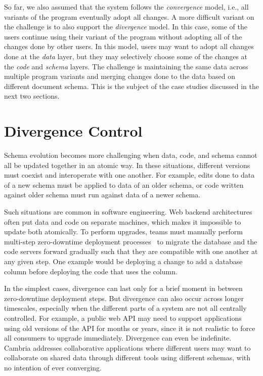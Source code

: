 \documentclass[english,crc]{programming}
\begin{document}
So far, we also assumed that the system follows the \emph{convergence} model, i.e., all variants
of the program eventually adopt all changes. A more difficult variant on the challenge is to also
support the \emph{divergence} model. In this case, some of the users continue using their variant
of the program without adopting all of the changes done by other users. In this model, users
may want to adopt all changes done at the \emph{data} layer, but they may selectively choose
some of the changes at the \emph{code} and \emph{schema} layers. The challenge is maintaining the
same data across multiple program variants and merging changes done to the data based on
different document schema. This is the subject of the case studies discussed in the next two
sections.


\section{Divergence Control}

Schema evolution becomes more challenging when data, code, and schema cannot all be updated
together in an atomic way. In these situations, different versions must coexist and interoperate
with one another. For example, edits done to data of a new schema must be applied to
data of an older schema, or code written against older schema must run against data of a newer schema.

Such situations are common in software engineering. Web backend architectures often put data and
code on separate machines, which makes it impossible to update both atomically. To perform
upgrades, teams must manually perform multi-step zero-downtime deployment processes~\cite{planetscalerails}
to migrate the database and the code servers forward gradually such that they are compatible with one
another at any given step. One example would be deploying a change to add a database column
before deploying the code that uses the column.

In the simplest cases, divergence can last only for a brief moment in between zero-downtime
deployment steps. But divergence can also occur across longer timescales, especially when
the different parts of a system are not all centrally controlled. For example,
a public web API may need to support applications using old versions of the API for months or
years, since it is not realistic to force all consumers to upgrade immediately. Divergence can
even be indefinite. Cambria \cite{Cambria} addresses collaborative applications where different
users may want to collaborate on shared data through different tools using different schemas,
with no intention of ever converging.
\end{document}
